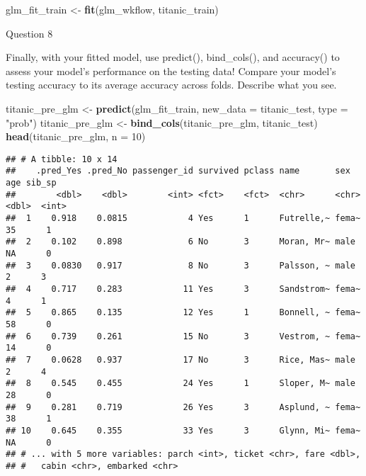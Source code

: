 \documentclass[]{article}
\newenvironment{Shaded}{\begin{snugshade}}{\end{snugshade}}
\newcommand{\DataTypeTok}[1]{\textcolor[rgb]{0.13,0.29,0.53}{#1}}
\newcommand{\DecValTok}[1]{\textcolor[rgb]{0.00,0.00,0.81}{#1}}
\newcommand{\KeywordTok}[1]{\textcolor[rgb]{0.13,0.29,0.53}{\textbf{#1}}}
\newcommand{\NormalTok}[1]{#1}
\newcommand{\StringTok}[1]{\textcolor[rgb]{0.31,0.60,0.02}{#1}}
\begin{document}
\begin{Shaded}
\begin{Highlighting}[]
\NormalTok{glm_fit_train <-}\StringTok{ }\KeywordTok{fit}\NormalTok{(glm_wkflow, titanic_train)}
\end{Highlighting}
\end{Shaded}

Question 8

Finally, with your fitted model, use predict(), bind\_cols(), and
accuracy() to assess your model's performance on the testing data!
Compare your model's testing accuracy to its average accuracy across
folds. Describe what you see.

\begin{Shaded}
\begin{Highlighting}[]
\NormalTok{titanic_pre_glm <-}\StringTok{ }\KeywordTok{predict}\NormalTok{(glm_fit_train, }\DataTypeTok{new_data =}\NormalTok{ titanic_test, }\DataTypeTok{type =} \StringTok{"prob"}\NormalTok{)}
\NormalTok{titanic_pre_glm <-}\StringTok{ }\KeywordTok{bind_cols}\NormalTok{(titanic_pre_glm, titanic_test)}
\KeywordTok{head}\NormalTok{(titanic_pre_glm, }\DataTypeTok{n =} \DecValTok{10}\NormalTok{)}
\end{Highlighting}
\end{Shaded}

\begin{verbatim}
## # A tibble: 10 x 14
##    .pred_Yes .pred_No passenger_id survived pclass name       sex     age sib_sp
##        <dbl>    <dbl>        <int> <fct>    <fct>  <chr>      <chr> <dbl>  <int>
##  1    0.918    0.0815            4 Yes      1      Futrelle,~ fema~    35      1
##  2    0.102    0.898             6 No       3      Moran, Mr~ male     NA      0
##  3    0.0830   0.917             8 No       3      Palsson, ~ male      2      3
##  4    0.717    0.283            11 Yes      3      Sandstrom~ fema~     4      1
##  5    0.865    0.135            12 Yes      1      Bonnell, ~ fema~    58      0
##  6    0.739    0.261            15 No       3      Vestrom, ~ fema~    14      0
##  7    0.0628   0.937            17 No       3      Rice, Mas~ male      2      4
##  8    0.545    0.455            24 Yes      1      Sloper, M~ male     28      0
##  9    0.281    0.719            26 Yes      3      Asplund, ~ fema~    38      1
## 10    0.645    0.355            33 Yes      3      Glynn, Mi~ fema~    NA      0
## # ... with 5 more variables: parch <int>, ticket <chr>, fare <dbl>,
## #   cabin <chr>, embarked <chr>
\end{verbatim}
\end{document}
